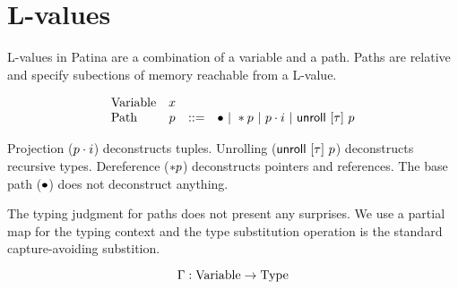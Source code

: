 \section*{L-values}

L-values in Patina are a combination of a variable and a path.
Paths are relative and specify subections of memory reachable from a L-value.

\[
\begin{array}{lccl}
\textrm{Variable} & x & & \\
\textrm{Path} & p & ::= & \bullet ~|~ *{p} ~|~ {p}\cdot{i} ~|~ \mathsf{unroll}~[{\tau}]~{p} \\
\end{array}
\]

Projection (${p}\cdot{i}$) deconstructs tuples.
Unrolling ($\mathsf{unroll}~[{\tau}]~{p}$) deconstructs recursive types.
Dereference ($*{p}$) deconstructs pointers and references.
The base path ($\bullet$) does not deconstruct anything.

The typing judgment for paths does not present any surprises.
We use a partial map for the typing context and
the type substitution operation is the standard capture-avoiding substition.

$$ \Gamma : \mathrm{Variable} \to \mathrm{Type} $$



